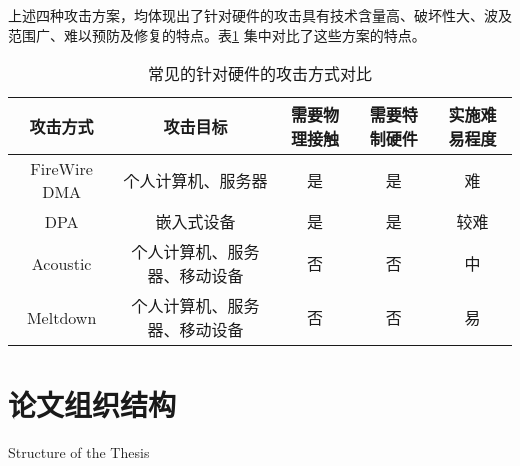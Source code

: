 上述四种攻击方案，均体现出了针对硬件的攻击具有技术含量高、破坏性大、波及范围广、难以预防及修复的特点。表\ref{tab:hw-attack-comp}
集中对比了这些方案的特点。

\begin{table}[!ht]
	\centering
\begin{threeparttable}[b]
\caption{常见的针对硬件的攻击方式对比}
\begin{tabular}{ccccc}
	\toprule
	攻击方式 & 攻击目标 & 需要物理接触 & 需要特制硬件 & 实施难易程度 \\
	\midrule
	FireWire DMA\cite{becher2005firewire} & 个人计算机、服务器 & 是 & 是 & 难 \\
	DPA\cite{kocher1999differential} & 嵌入式设备 & 是 & 是 & 较难 \\
	Acoustic\cite{acoustic} & 个人计算机、服务器、移动设备 & 否 & 否 & 中 \\
	Meltdown\cite{lipp_meltdown_2018} & 个人计算机、服务器、移动设备 & 否 & 否 & 易 \\
	\bottomrule
\end{tabular}
\label{tab:hw-attack-comp}
\end{threeparttable}
\end{table}


\section{论文组织结构}{Structure of the Thesis}
\somewords


\newpage
